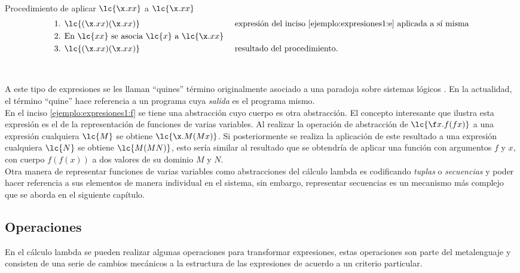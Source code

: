 \begin{ejemplo} Procedimiento de aplicar \(\lc{\x.x x}\) a \(\lc{\x.x x}\)
  \label{ejemplo:aplicacion2}
  \begin{align*}
    \text{1. } &\lc{(\x.x x)(\x.x x)} & &\text{ expresión del inciso \eqref{ejemplo:expresiones1:e} aplicada a sí misma}\\
    \text{2. } &\text{En } \lc{x x} \text{ se asocia } \lc{x} \text{ a } \lc{\x.x x} \\
    \text{3. } &\lc{(\x.x x)(\x.x x)} & &\text{ resultado del procedimiento.}
  \end{align*}
\end{ejemplo} \

A este tipo de expresiones se les llaman ``quines''
\cite[pp.~431--437]{Hofstadter:GEB} término originalmente asociado a una
paradoja sobre sistemas lógicos \cite{Quine:Paradox}. En la actualidad, el
término ``quine'' hace referencia a un programa cuya \emph{salida} es el
programa mismo. \\

En el inciso \eqref{ejemplo:expresiones1:f} se tiene una abstracción cuyo cuerpo
es otra abstracción. El concepto interesante que ilustra esta expresión es el de
la representación de funciones de varias variables. Al realizar la operación de
abstracción de \(\lc{\f x.f(f x)}\) a una expresión cualquiera \(\lc{M}\) se
obtiene \(\lc{\x.M(M x)}\). Si posteriormente se realiza la aplicación de este
resultado a una expresión cualquiera \(\lc{N}\) se obtiene \(\lc{M(M N)}\), esto
sería similar al resultado que se obtendría de aplicar una función con
argumentos \(f\) y \(x\), con cuerpo \(f(f(x))\) a dos valores de su dominio
\(M\) y \(N\). \\

Otra manera de representar funciones de varias variables como abstracciones del
cálculo lambda es codificando \emph{tuplas} o \emph{secuencias} y poder hacer
referencia a sus elementos de manera individual en el sistema, sin embargo,
representar secuencias es un mecanismo más complejo que se aborda en el
siguiente capítulo. \\

\subsection{Operaciones}

En el cálculo lambda se pueden realizar algunas operaciones para transformar
expresiones, estas operaciones son parte del metalenguaje y consisten de una
serie de cambios mecánicos a la estructura de las expresiones de acuerdo a un
criterio particular. \\

